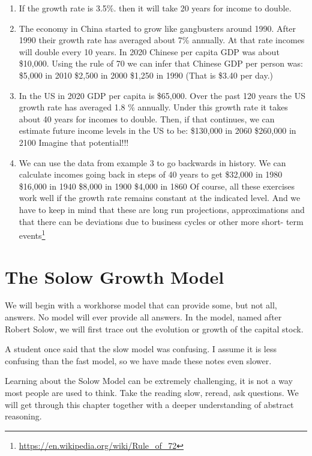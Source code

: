\documentclass[
]{book}
\begin{document}
\begin{enumerate}
\def\labelenumi{\arabic{enumi}.}
\item
  If the growth rate is 3.5\%. then it will take 20 years for income to double.
\item
  The economy in China started to grow like gangbusters around 1990. After 1990 their growth rate has averaged about 7\% annually. At that rate incomes will double every 10 years. In 2020 Chinese per capita GDP was about \$10,000. Using the rule of 70 we can infer that Chinese GDP per person was:
  \$5,000 in 2010
  \$2,500 in 2000
  \$1,250 in 1990 (That is \$3.40 per day.)
\item
  In the US in 2020 GDP per capita is \$65,000. Over the past 120 years the US growth rate has averaged 1.8 \% annually. Under this growth rate it takes about 40 years for incomes to double. Then, if that continues, we can estimate future income levels in the US to be:
  \$130,000 in 2060
  \$260,000 in 2100
  Imagine that potential!!!
\item
  We can use the data from example 3 to go backwards in history. We can calculate incomes going back in steps of 40 years to get
  \$32,000 in 1980
  \$16,000 in 1940
  \$8,000 in 1900
  \$4,000 in 1860
  Of course, all these exercises work well if the growth rate remains constant at the indicated level. And we have to keep in mind that these are long run projections, approximations and that there can be deviations due to business cycles or other more short- term events\footnote{\url{https://en.wikipedia.org/wiki/Rule_of_72}}
\end{enumerate}

\hypertarget{the-solow-growth-model}{%
\section{The Solow Growth Model}\label{the-solow-growth-model}}

We will begin with a workhorse model that can provide some, but not all, answers. No model will ever provide all answers. In the model, named after Robert Solow, we will first trace out the evolution or growth of the capital stock.

A student once said that the slow model was confusing. I assume it is less confusing than the fast model, so we have made these notes even slower.

Learning about the Solow Model can be extremely challenging, it is not a way most people are used to think. Take the reading slow, reread, ask questions. We will get through this chapter together with a deeper understanding of abstract reasoning.
\end{document}
